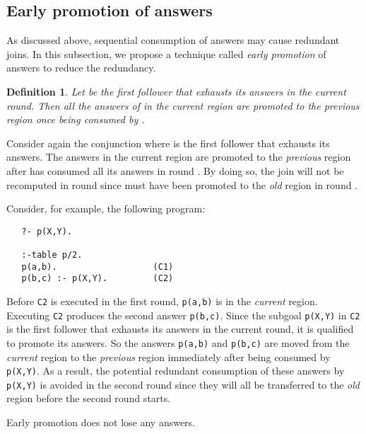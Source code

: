 \documentclass{tlp}
\newtheorem{definition}{Definition} \newtheorem{example}{Example} \newcommand{\pivot}[1]{\mathbin{\, {#1} \,}}
\begin{document}
\vspace*{0.5cm}
\subsection{Early promotion of answers}
As discussed above, sequential consumption of answers may cause redundant joins. In this subsection, we propose a technique called {\it early promotion} of answers to reduce the redundancy.

\begin{definition} {\rm Let  be the first follower that exhausts its answers in the current round.
Then all the answers of  in the {\it current} region are promoted to the {\it previous} region once being consumed by .}
\end{definition}

Consider again the conjunction  where  is the first follower that exhausts its answers. The answers in the current region  are promoted to the {\it previous} region after  has consumed all its answers in round . By doing so, the join  will not be recomputed in round  since  must have been promoted to the {\it old} region in round .

Consider, for example, the following program:
\begin{verbatim}
   ?- p(X,Y).

   :-table p/2.
   p(a,b).                   (C1)
   p(b,c) :- p(X,Y).         (C2)
\end{verbatim}
Before {\tt C2} is executed in the first round, {\tt p(a,b)} is in the {\it current} region. Executing {\tt C2} produces the second answer {\tt p(b,c)}. Since the subgoal {\tt p(X,Y)} in {\tt C2} is the first follower that exhausts its answers in the current round, it is qualified to promote its answers. So the answers {\tt p(a,b)} and {\tt p(b,c)} are moved from the {\it current} region to the {\it previous} region immediately after being consumed by {\tt p(X,Y)}. As a result, the potential redundant consumption of these answers by {\tt p(X,Y)} is avoided in the second round since they will all be transferred to the {\it old} region before the second round starts.

\begin{theorem}
Early promotion does not lose any answers. 
\end{theorem}
\end{document}
